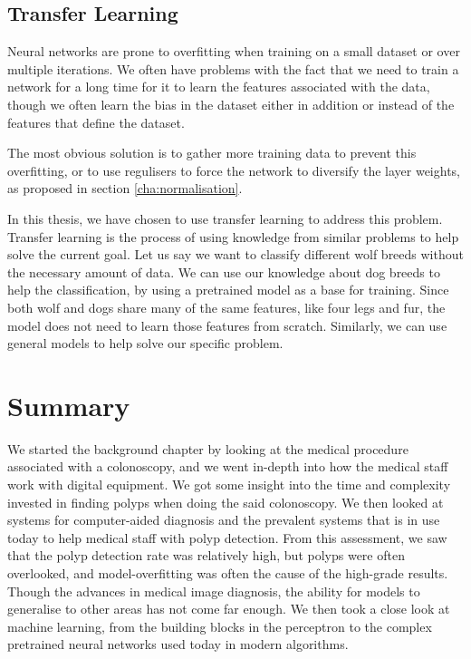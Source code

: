 
    
\subsection{Transfer Learning}
Neural networks are prone to overfitting when training on a small dataset or over multiple iterations. We often have problems with the fact that we need to train a network for a long time for it to learn the features associated with the data, though we often learn the bias in the dataset either in addition or instead of the features that define the dataset.

The most obvious solution is to gather more training data to prevent this overfitting, or to use regulisers to force the network to diversify the layer weights, as proposed in section \ref{cha:normalisation}.

In this thesis, we have chosen to use transfer learning to address this problem. Transfer learning is the process of using knowledge from similar problems to help solve the current goal.  Let us say we want to classify different wolf breeds without the necessary amount of data. We can use our knowledge about dog breeds to help the classification, by using a pretrained model as a base for training. Since both wolf and dogs share many of the same features, like four legs and fur, the model does not need to learn those features from scratch.
Similarly, we can use general models to help solve our specific problem.



     
   
\section{Summary}
We started the background chapter by looking at the medical procedure associated with a colonoscopy, and we went in-depth into how the medical staff work with digital equipment. We got some insight into the time and complexity invested in finding polyps when doing the said colonoscopy.
We then looked at systems for computer-aided diagnosis and the prevalent systems that is in use today to help medical staff with polyp detection. 
From this assessment, we saw that the polyp detection rate was relatively high, but polyps were often overlooked, and model-overfitting was often the cause of the high-grade results. Though the advances in medical image diagnosis, the ability for models to generalise to other areas has not come far enough.
We then took a close look at machine learning, from the building blocks in the perceptron to the complex pretrained neural networks used today in modern algorithms. 

